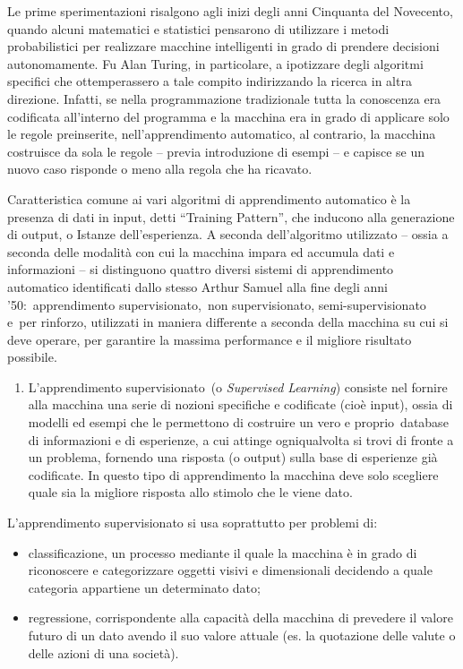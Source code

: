 \documentclass[
  b5paper,
  twoside,
  11pt,
  chapterprefix=false,
  bibliography=totocnumbered,
  parskip=0]{scrbook}
\providecommand{\tightlist}{%
  \setlength{\itemsep}{0pt}\setlength{\parskip}{0pt}}
\begin{document}
Le prime sperimentazioni risalgono agli inizi degli anni Cinquanta del
Novecento, quando alcuni matematici e statistici pensarono di utilizzare
i metodi probabilistici per realizzare macchine intelligenti in grado di
prendere decisioni autonomamente. Fu Alan Turing, in particolare, a
ipotizzare degli algoritmi specifici che ottemperassero a tale compito
indirizzando la ricerca in altra direzione. Infatti, se nella
programmazione tradizionale tutta la conoscenza era codificata
all'interno del programma e la macchina era in grado di applicare solo
le regole preinserite, nell'apprendimento automatico, al contrario, la
macchina costruisce da sola le regole -- previa introduzione di esempi
-- e capisce se un nuovo caso risponde o meno alla regola che ha
ricavato.

Caratteristica comune ai vari algoritmi di apprendimento automatico è la
presenza di dati in input, detti \enquote{Training Pattern}, che inducono alla
generazione di output, o Istanze dell'esperienza. A seconda
dell'algoritmo utilizzato -- ossia a seconda delle modalità con cui la
macchina impara ed accumula dati e informazioni -- si distinguono
quattro diversi sistemi di apprendimento automatico identificati dallo
stesso Arthur Samuel alla fine degli anni '50:~apprendimento
supervisionato,~non supervisionato, semi-supervisionato e~per rinforzo,
utilizzati in maniera differente a seconda della macchina su cui si deve
operare, per garantire la massima performance e il migliore risultato
possibile.

\begin{enumerate}
\def\labelenumi{\arabic{enumi}.}
\tightlist
\item
  L'apprendimento supervisionato~(o \emph{Supervised Learning}) consiste
  nel fornire alla macchina una serie di nozioni specifiche e
  codificate (cioè input), ossia di modelli ed esempi che le
  permettono di costruire un vero e proprio~database di informazioni e
  di esperienze, a cui attinge ogniqualvolta si trovi di fronte a un
  problema, fornendo una risposta (o output) sulla base di esperienze
  già codificate. In questo tipo di apprendimento la macchina deve
  solo scegliere quale sia la migliore risposta allo stimolo che le
  viene dato.
\end{enumerate}

L'apprendimento supervisionato si usa soprattutto per problemi di:

\begin{itemize}
\item
  classificazione, un processo mediante il quale la macchina è in
  grado di riconoscere e categorizzare oggetti visivi e dimensionali
  decidendo a quale categoria appartiene un determinato dato;
\item
  regressione, corrispondente alla capacità della macchina di
  prevedere il valore futuro di un dato avendo il suo valore attuale
  (es. la quotazione delle valute o delle azioni di una società).
\end{itemize}
\end{document}
